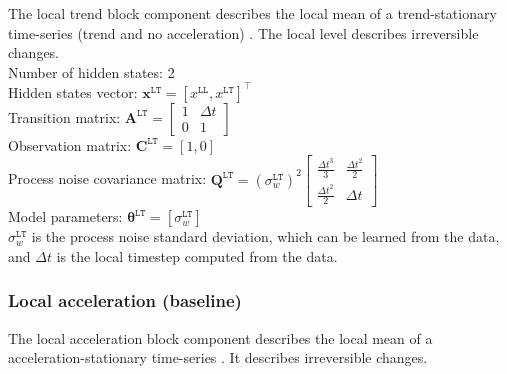 The local trend block component describes the local mean of a trend-stationary time-series (trend and no acceleration) \cite{STC:STC2035}. 
The local level describes irreversible changes.\\

\noindent
Number of hidden states: 2\\
Hidden states vector: $ \mathbf{x}^{\mathtt{LT}} = [x^{\mathtt{LL}}, x^{\mathtt{LT}}]^{\intercal}$\\
Transition matrix: $\mathbf{A}^{\mathtt{LT}}= \left[\begin{array}{cc}1 &\Delta t\\0&1\end{array}\right]$\\
Observation matrix: $\mathbf{C}^{\mathtt{LT}}=[1, 0]$\\
Process noise covariance matrix: $\mathbf{Q}^{\mathtt{LT}}= (\sigma_{w}^{\mathtt{LT}})^{2}\left[\begin{array}{cc}\tfrac{\Delta t^{3}}{3} &\tfrac{\Delta t^{2}}{2}\\\tfrac{\Delta t^{2}}{2}&\Delta t\end{array}\right]$\\
Model parameters: $\bm\theta^{\mathtt{LT}}=[\sigma_{w}^{\mathtt{LT}} ]$\\

\noindent
$\sigma_{w}^{\mathtt{LT}}$ is the process noise standard deviation, which can be learned from the data, and $\Delta t$ is the local timestep computed from the data.


\subsubsection{Local acceleration (baseline)}

The local acceleration block component describes the local mean of a acceleration-stationary time-series \cite{STC:STC2035}. 
It describes irreversible changes.\\

